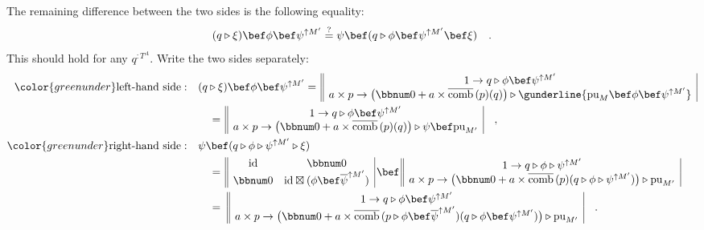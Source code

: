 The remaining difference between the two sides is the following equality:
\[
(q\triangleright\xi)\bef\phi\bef\psi^{\uparrow M^{\prime}}\overset{?}{=}\psi\bef(q\triangleright\phi\bef\psi^{\uparrow M^{\prime}}\bef\xi)\quad.
\]
This should hold for any $q^{:T^{A}}$. Write the two sides separately:
\begin{align*}
{\color{greenunder}\text{left-hand side}:}\quad & (q\triangleright\xi)\bef\phi\bef\psi^{\uparrow M^{\prime}}=\,\begin{array}{||c|}
1\rightarrow q\triangleright\phi\bef\psi^{\uparrow M^{\prime}}\\
a\times p\rightarrow\big(\bbnum 0+a\times\overline{\text{comb}}\,(p)(q)\big)\triangleright\gunderline{\text{pu}_{M}\bef\phi\bef\psi^{\uparrow M^{\prime}}}
\end{array}\\
 & \quad=\,\begin{array}{||c|}
1\rightarrow q\triangleright\phi\bef\psi^{\uparrow M^{\prime}}\\
a\times p\rightarrow\big(\bbnum 0+a\times\overline{\text{comb}}\,(p)(q)\big)\triangleright\psi\bef\text{pu}_{M^{\prime}}
\end{array}\quad,\\
{\color{greenunder}\text{right-hand side}:}\quad & \psi\bef(q\triangleright\phi\triangleright\psi^{\uparrow M^{\prime}}\triangleright\xi)\\
 & \quad=\,\begin{array}{||cc|}
\text{id} & \bbnum 0\\
\bbnum 0 & \text{id}\boxtimes(\phi\bef\overline{\psi}^{\uparrow M^{\prime}})
\end{array}\,\bef\,\begin{array}{||c|}
1\rightarrow q\triangleright\phi\triangleright\psi^{\uparrow M^{\prime}}\\
a\times p\rightarrow\big(\bbnum 0+a\times\overline{\text{comb}}\,(p)(q\triangleright\phi\triangleright\psi^{\uparrow M^{\prime}})\big)\triangleright\text{pu}_{M^{\prime}}
\end{array}\\
 & \quad=\,\,\begin{array}{||c|}
1\rightarrow q\triangleright\phi\bef\psi^{\uparrow M^{\prime}}\\
a\times p\rightarrow\big(\bbnum 0+a\times\overline{\text{comb}}\,(p\triangleright\phi\bef\overline{\psi}^{\uparrow M^{\prime}})(q\triangleright\phi\bef\psi^{\uparrow M^{\prime}})\big)\triangleright\text{pu}_{M^{\prime}}
\end{array}\quad.
\end{align*}
